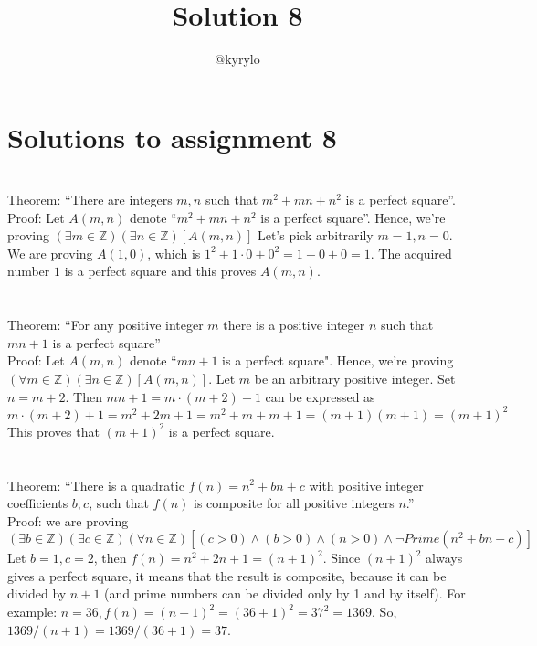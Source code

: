 \documentclass{article}
\title{Solution 8}
\author{@kyrylo}
\begin{document}
\section*{Solutions to assignment 8}

\section{}

Theorem: ``There are integers $m, n$ such that $m^2 + mn + n^2$ is a perfect
square''.
\\
Proof: Let $A(m, n)$ denote ``$m^2 + mn + n^2$ is a perfect square''.
Hence, we're proving $(\exists m \in \mathbb{Z})(\exists n \in \mathbb{Z})[A(m, n)]$
Let's pick arbitrarily $m = 1, n = 0$. We are proving $A(1, 0)$, which is
$1^2 + 1 \cdot 0 + 0^2 = 1 + 0 + 0 = 1$. The acquired number $1$ is a perfect square and this
proves $A(m, n)$.

\section{}

Theorem: ``For any positive integer $m$ there is a positive integer $n$ such
that $mn + 1$ is a perfect square''
\\
Proof: Let $A(m, n)$ denote ``$mn + 1$ is a perfect square". Hence, we're
proving $(\forall m \in \mathbb{Z})(\exists n \in \mathbb{Z})[A(m, n)]$. Let $m$
be an arbitrary positive integer. Set $n = m + 2$. Then $mn + 1 = m \cdot (m +
2) + 1$ can be expressed as
\\
$m \cdot (m + 2) + 1 = m^2 + 2m + 1 = m^2 + m + m + 1 = (m + 1)(m + 1) = (m + 1)^2$
\\
This proves that $(m + 1)^2$ is a perfect square.

\section{}

Theorem: ``There is a quadratic $f(n) = n^2 + bn + c$ with positive integer
coefficients $b, c$, such that $f(n)$ is composite for all positive integers
$n$.''
\\
Proof: we are proving
\\
$(\exists b \in \mathbb{Z})(\exists c \in \mathbb{Z})(\forall n \in
\mathbb{Z})[(c > 0) \wedge (b > 0) \wedge (n > 0) \wedge \neg Prime(n^2 + bn +
c)]$ Let $b = 1, c = 2$, then $f(n) = n^2 + 2n + 1 = (n + 1)^2$. Since $(n +
1)^2$ always gives a perfect square, it means that the result is composite,
because it can be divided by $n + 1$ (and prime numbers can be divided only by 1 and
by itself). For example: $n = 36, f(n) = (n + 1)^2 = (36 + 1)^2 = 37^2 =
1369$. So, $1369 / (n + 1)= 1369 / (36 + 1) = 37$.
\end{document}
